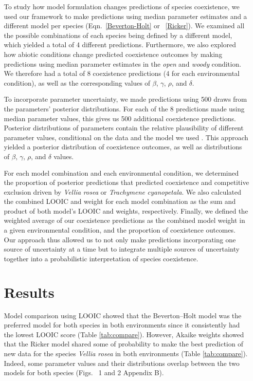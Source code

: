 \begin{refsection}
To study how model formulation changes predictions of species coexistence, we used our framework to make predictions using median parameter estimates and a different model per species (Eqn.~\ref{Beverton-Holt} or ~\ref{Ricker}). We examined all the possible combinations of each species being defined by a different model, which yielded a total of 4 different predictions. Furthermore, we also explored how abiotic conditions change predicted coexistence outcomes by making predictions using median parameter estimates in the \textit{open} and \textit{woody} condition. We therefore had a total of 8 coexistence predictions (4 for each environmental condition), as well as the corresponding values of $\beta$, $\gamma$, $\rho$, and $\delta$.


To incorporate parameter uncertainty, we made predictions using 500 draws from the parameters' posterior distributions. For each of the 8 predictions made using median parameter values, this gives us 500 additional coexistence predictions. Posterior distributions of parameters contain the relative plausibility of different parameter values, conditional on the data and the model we used \citep{mcelreath_statistical_2018}. This approach yielded a posterior distribution of coexistence outcomes, as well as distributions of $\beta$, $\gamma$, $\rho$, and $\delta$ values.

For each model combination and each environmental condition, we determined the proportion of posterior predictions that predicted coexistence and competitive exclusion driven by \textit{Vellia rosea} or \textit{Trachymene cyanopetala}. We also calculated the combined LOOIC and weight for each model combination as the sum and product of both model’s LOOIC and weights, respectively. Finally, we  defined the weighted average of our coexistence predictions as the combined model weight in a given environmental condition, and the proportion of coexistence outcomes. Our approach thus allowed us to not only make predictions incorporating one source of uncertainty at a time but to integrate multiple sources of uncertainty together into a probabilistic interpretation of species coexistence.

\section*{Results}

Model comparison using LOOIC showed that the Beverton--Holt model was the preferred model for both species in both environments since it consistently had the lowest LOOIC score (Table \ref{tab:compare}). However, Akaike weights showed that the Ricker model shared some of probability to make the best prediction of new data for the species \textit{Vellia rosea} in both environments (Table \ref{tab:compare}). Indeed, some parameter values and their distributions overlap between the two models for both species (Figs.~ 1 and 2 Appendix B).



\end{refsection}
